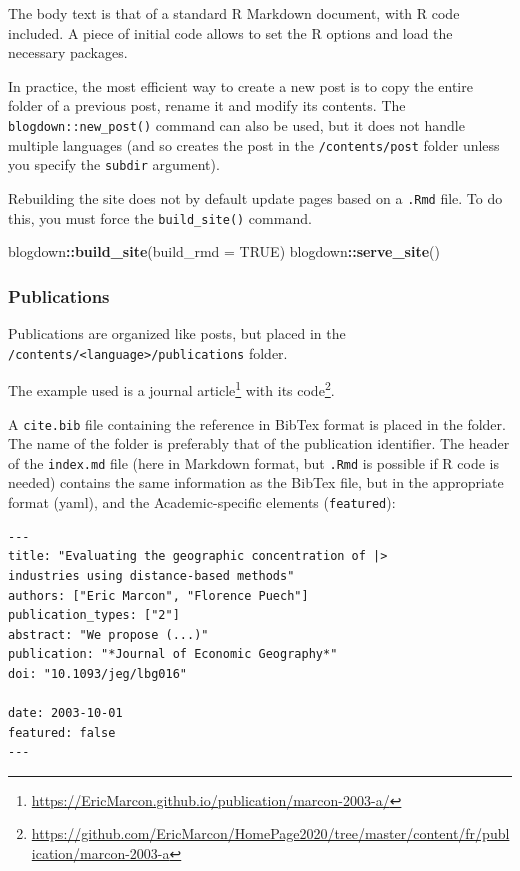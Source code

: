 \documentclass[
  12pt,
  american,
  a4paper,
  extrafontsizes,onecolumn,openright
  ]{memoir}
\newenvironment{Shaded}{\begin{snugshade}}{\end{snugshade}}
\newcommand{\AttributeTok}[1]{\textcolor[rgb]{0.13,0.29,0.53}{#1}}
\newcommand{\ConstantTok}[1]{\textcolor[rgb]{0.56,0.35,0.01}{#1}}
\newcommand{\FunctionTok}[1]{\textcolor[rgb]{0.13,0.29,0.53}{\textbf{#1}}}
\newcommand{\NormalTok}[1]{#1}
\newcommand{\SpecialCharTok}[1]{\textcolor[rgb]{0.81,0.36,0.00}{\textbf{#1}}}
\begin{document}
The body text is that of a standard R Markdown document, with R code included.
A piece of initial code allows to set the R options and load the necessary packages.

In practice, the most efficient way to create a new post is to copy the entire folder of a previous post, rename it and modify its contents.
The \texttt{blogdown::new\_post()} command can also be used, but it does not handle multiple languages (and so creates the post in the \texttt{/contents/post} folder unless you specify the \texttt{subdir} argument).

Rebuilding the site does not by default update pages based on a \texttt{.Rmd} file.
To do this, you must force the \texttt{build\_site()} command.

\scriptsize

\begin{Shaded}
\begin{Highlighting}[]
\NormalTok{blogdown}\SpecialCharTok{::}\FunctionTok{build\_site}\NormalTok{(}\AttributeTok{build\_rmd =} \ConstantTok{TRUE}\NormalTok{)}
\NormalTok{blogdown}\SpecialCharTok{::}\FunctionTok{serve\_site}\NormalTok{()}
\end{Highlighting}
\end{Shaded}

\normalsize

\subsubsection{Publications}\label{publications}

Publications are organized like posts, but placed in the \texttt{/contents/\textless{}language\textgreater{}}\break\texttt{/publications} folder.

The example used is a journal article\footnote{\url{https://EricMarcon.github.io/publication/marcon-2003-a/}} with its code\footnote{\url{https://github.com/EricMarcon/HomePage2020/tree/master/content/fr/publication/marcon-2003-a}}.

A \texttt{cite.bib} file containing the reference in BibTex format is placed in the folder.
The name of the folder is preferably that of the publication identifier.
The header of the \texttt{index.md} file (here in Markdown format, but \texttt{.Rmd} is possible if R code is needed) contains the same information as the BibTex file, but in the appropriate format (yaml), and the Academic-specific elements (\texttt{featured}):

\begin{verbatim}
---
title: "Evaluating the geographic concentration of |>
industries using distance-based methods"
authors: ["Eric Marcon", "Florence Puech"]
publication_types: ["2"]
abstract: "We propose (...)"
publication: "*Journal of Economic Geography*"
doi: "10.1093/jeg/lbg016"

date: 2003-10-01
featured: false
---
\end{verbatim}
\end{document}
